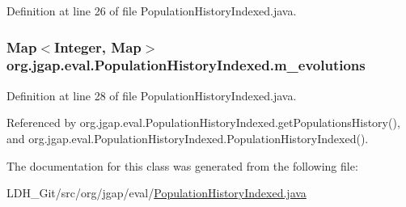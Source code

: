 Definition at line 26 of file Population\-History\-Indexed.\-java.

\hypertarget{classorg_1_1jgap_1_1eval_1_1_population_history_indexed_a4cedcd019d4c8c769a1bbc64ef08581a}{
\subsubsection[{m\-\_\-evolutions}]{\setlength{\rightskip}{0pt plus 5cm}Map$<$Integer, Map$>$ org.\-jgap.\-eval.\-Population\-History\-Indexed.\-m\-\_\-evolutions\hspace{0.3cm}{\ttfamily [private]}}}\label{classorg_1_1jgap_1_1eval_1_1_population_history_indexed_a4cedcd019d4c8c769a1bbc64ef08581a}


Definition at line 28 of file Population\-History\-Indexed.\-java.



Referenced by org.\-jgap.\-eval.\-Population\-History\-Indexed.\-get\-Populations\-History(), and org.\-jgap.\-eval.\-Population\-History\-Indexed.\-Population\-History\-Indexed().



The documentation for this class was generated from the following file\-:\begin{DoxyCompactItemize}
\item 
L\-D\-H\-\_\-\-Git/src/org/jgap/eval/\hyperlink{_population_history_indexed_8java}{Population\-History\-Indexed.\-java}\end{DoxyCompactItemize}
